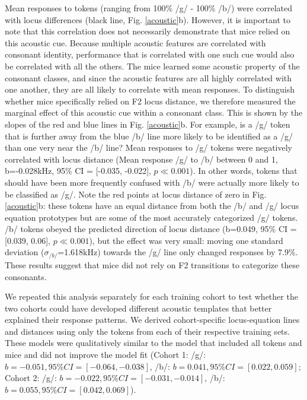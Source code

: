 \documentclass[preprint, NumberedRefs]{JASAnew}\usepackage[]{graphicx}\usepackage[]{color}
\begin{document}
Mean responses to tokens (ranging from 100\% /g/ - 100\% /b/) were correlated with locus differences (black line, Fig. \ref{acoustic}b). However, it is important to note that this correlation does not necessarily demonstrate that mice relied on this acoustic cue. Because multiple acoustic features are correlated with consonant identity, performance that is correlated with one such cue would also be correlated with all the others.
The mice learned some acoustic property of the consonant classes, and since the acoustic features are all highly correlated with one another, they are all likely to correlate with mean responses.
To distinguish whether mice specifically relied on F2 locus distance, we therefore measured the marginal effect of this acoustic cue within a consonant class. This is shown by the slopes of the red and blue lines in Fig. \ref{acoustic}b. For example, is a /g/ token that is further away from the blue /b/ line more likely to be identified as a /g/ than one very near the /b/ line? Mean responses to /g/ tokens were negatively correlated with locus distance (Mean response /g/ to /b/ between 0 and 1, b=-0.028kHz, 95\% CI = [-0.035, -0.022], $p \ll 0.001$). In other words, tokens that should have been more frequently confused with /b/ were actually more likely to be classified as /g/. Note the red points at locus distance of zero in Fig. \ref{acoustic}b: these tokens have an equal distance from both the /b/ and /g/ locus equation prototypes but are some of the most accurately categorized /g/ tokens. /b/ tokens obeyed the predicted direction of locus distance (b=0.049, 95\% CI = [0.039, 0.06], $p \ll 0.001$), but the effect was very small: moving one standard deviation ($\sigma_{/b/}$=1.618kHz) towards the /g/ line only changed responses by 7.9\%. These results suggest that mice did not rely on F2 transitions to categorize these consonants.

We repeated this analysis separately for each training cohort to test whether the two cohorts could have developed different acoustic templates that better explained their response patterns. We derived cohort-specific locus-equation lines and distances using only the tokens from each of their respective training sets. These models were qualitatively similar to the model that included all tokens and mice and did not improve the model fit (Cohort 1: /g/: $b=-0.051, 95\% CI = [-0.064, -0.038]$, /b/: $b=0.041, 95\% CI = [0.022, 0.059]$; Cohort 2: /g/: $b=-0.022, 95\% CI = [-0.031, -0.014]$, /b/: $b=0.055, 95\% CI = [0.042, 0.069]$).
\end{document}
